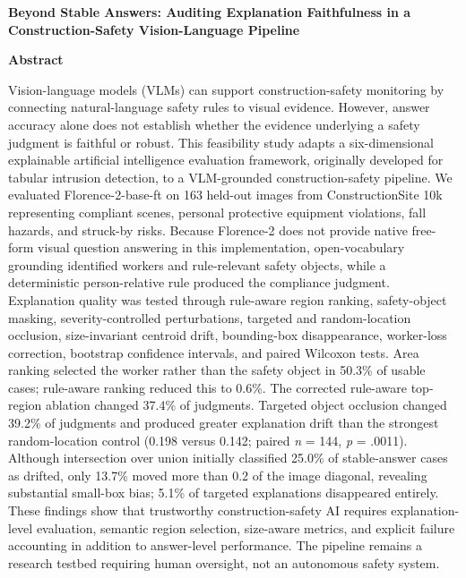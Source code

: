 \documentclass[12pt,letterpaper,twoside]{article}
\begin{document}
\begin{center}
\textbf{Beyond Stable Answers: Auditing Explanation Faithfulness in a Construction-Safety Vision-Language Pipeline}
\end{center}

\begin{center}
\textbf{Abstract}
\end{center}

Vision-language models (VLMs) can support construction-safety monitoring by connecting natural-language safety rules to visual evidence. However, answer accuracy alone does not establish whether the evidence underlying a safety judgment is faithful or robust. This feasibility study adapts a six-dimensional explainable artificial intelligence evaluation framework, originally developed for tabular intrusion detection, to a VLM-grounded construction-safety pipeline. We evaluated Florence-2-base-ft on 163 held-out images from ConstructionSite 10k representing compliant scenes, personal protective equipment violations, fall hazards, and struck-by risks. Because Florence-2 does not provide native free-form visual question answering in this implementation, open-vocabulary grounding identified workers and rule-relevant safety objects, while a deterministic person-relative rule produced the compliance judgment. Explanation quality was tested through rule-aware region ranking, safety-object masking, severity-controlled perturbations, targeted and random-location occlusion, size-invariant centroid drift, bounding-box disappearance, worker-loss correction, bootstrap confidence intervals, and paired Wilcoxon tests. Area ranking selected the worker rather than the safety object in 50.3\% of usable cases; rule-aware ranking reduced this to 0.6\%. The corrected rule-aware top-region ablation changed 37.4\% of judgments. Targeted object occlusion changed 39.2\% of judgments and produced greater explanation drift than the strongest random-location control (0.198 versus 0.142; paired \textit{n} = 144, \textit{p} = .0011). Although intersection over union initially classified 25.0\% of stable-answer cases as drifted, only 13.7\% moved more than 0.2 of the image diagonal, revealing substantial small-box bias; 5.1\% of targeted explanations disappeared entirely. These findings show that trustworthy construction-safety AI requires explanation-level evaluation, semantic region selection, size-aware metrics, and explicit failure accounting in addition to answer-level performance. The pipeline remains a research testbed requiring human oversight, not an autonomous safety system.
\end{document}
